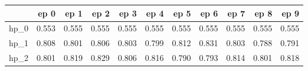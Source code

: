 \begin{tabular}{lrrrrrrrrrr}
\toprule
{} &   ep 0 &   ep 1 &   ep 2 &   ep 3 &   ep 4 &   ep 5 &   ep 6 &   ep 7 &   ep 8 &   ep 9 \\
\midrule
hp\_0 &  0.553 &  0.555 &  0.555 &  0.555 &  0.555 &  0.555 &  0.555 &  0.555 &  0.555 &  0.555 \\
hp\_1 &  0.808 &  0.801 &  0.806 &  0.803 &  0.799 &  0.812 &  0.831 &  0.803 &  0.788 &  0.791 \\
hp\_2 &  0.801 &  0.819 &  0.829 &  0.806 &  0.816 &  0.790 &  0.793 &  0.814 &  0.801 &  0.818 \\
\bottomrule
\end{tabular}
